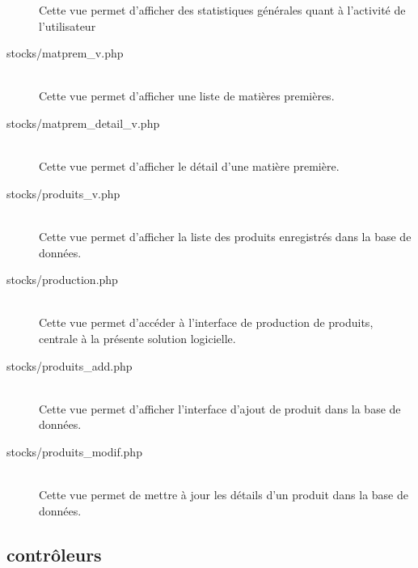\begin{description}
                Cette vue permet d'afficher des statistiques générales quant
                à l'activité de l'utilisateur
            \item[stocks/matprem\_v.php]\hfill \\
                Cette vue permet d'afficher une liste de matières premières.
            \item[stocks/matprem\_detail\_v.php]\hfill \\
                Cette vue permet d'afficher le détail d'une matière première.
            \item[stocks/produits\_v.php]\hfill \\
                Cette vue permet d'afficher la liste des produits enregistrés
                dans la base de données.
            \item[stocks/production.php]\hfill \\
                Cette vue permet d'accéder à l'interface de production de
                produits, centrale à la présente solution logicielle.
            \item[stocks/produits\_add.php]\hfill \\
                Cette vue permet d'afficher l'interface d'ajout de produit
                dans la base de données.
            \item[stocks/produits\_modif.php]\hfill \\
                Cette vue permet de mettre à jour les détails d'un produit
                dans la base de données.
        \end{description}

    \subsection{contrôleurs}
